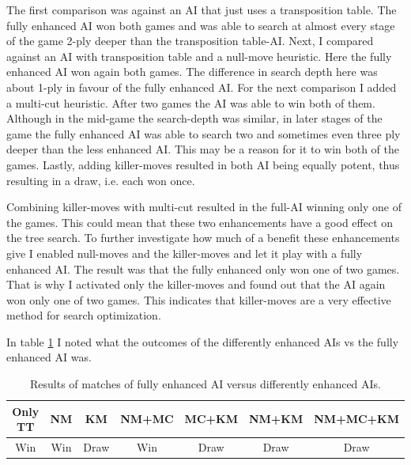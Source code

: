 \documentclass[a4paper]{article}
\begin{document}
The first comparison was against an AI that just uses a transposition table. The fully enhanced AI won both games and was able to search at almost every stage of the game 2-ply deeper than the transposition table-AI.
Next, I compared against an AI with transposition table and a null-move heuristic. Here the fully enhanced AI won again both games. The difference in search depth here was about 1-ply in favour of the fully enhanced AI.
For the next comparison I added a multi-cut heuristic. After two games the AI was able to win both of them. Although in the mid-game the search-depth was similar, in later stages of the game the fully enhanced AI was able to search two and sometimes even three ply deeper than the less enhanced AI. This may be a reason for it to win both of the games.
Lastly, adding killer-moves resulted in both AI being equally potent, thus resulting in a draw, i.e. each won once.

Combining killer-moves with multi-cut resulted in the full-AI winning only one of the games. This could mean that these two enhancements have a good effect on the tree search. To further investigate how much of a benefit these enhancements give I enabled null-moves and the killer-moves and let it play with a fully enhanced AI. The result was that the fully enhanced only won one of two games. That is why I activated only the killer-moves and found out that the AI again won only one of two games. This indicates that killer-moves are a very effective method for search optimization.

In table \ref{resultsTable} I noted what the outcomes of the differently enhanced AIs vs the fully enhanced AI was.

\begin{table}
\begin{tabular}{c|c|c|c|c|c|c}
	Only TT & NM & KM & NM+MC & MC+KM & NM+KM & NM+MC+KM \\
	\hline
	Win & Win & Draw & Win & Draw & Draw & Draw
\end{tabular}
\caption{Results of matches of fully enhanced AI versus differently enhanced AIs.}
\label{resultsTable}
\end{table}
\end{document}
